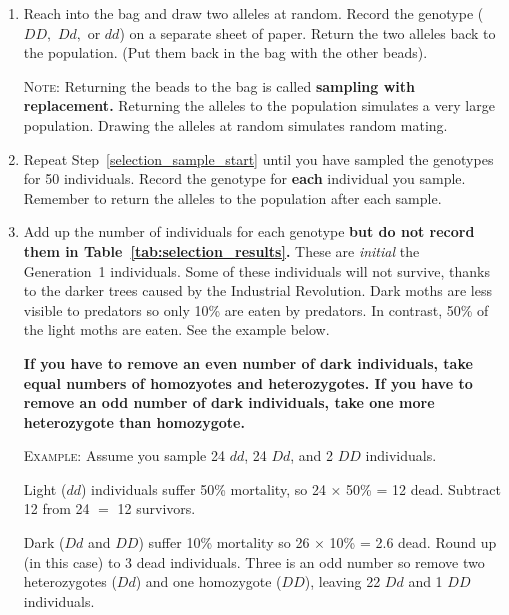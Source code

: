 \documentclass[12pt, hidelinks]{exam}
\newcommand{\allele}[1]{$#1$}
\begin{document}
\begin{questions}
\begin{enumerate}
	\item \label{selection_sample_start} Reach into the bag and draw two alleles at random. Record the genotype (\allele{DD,} \allele{Dd,} or \allele{dd}) on a separate sheet of paper. Return the two alleles back to the population. (Put them back in the bag with the other beads).
	
	\textsc{Note:} Returning the beads to the bag is called \textbf{sampling with replacement.} Returning the alleles to the population simulates a very large population. Drawing the alleles at random simulates random mating.
	
	\item Repeat Step~\ref{selection_sample_start} until you have sampled the genotypes for 50 individuals. Record the genotype for \textbf{each} individual you sample. Remember to return the alleles to the population after each sample. 
	
	\item Add up the number of individuals for each genotype \textbf{ but do not record them in Table~\ref{tab:selection_results}.} These are \emph{initial} the Generation~1 individuals. %
	 Some of these individuals will not survive, thanks to the darker trees caused by the Industrial Revolution. Dark moths are less visible to predators so only 10\% are eaten by predators. In contrast, 50\% of the light moths are eaten. See the example below.
	
	
	\textbf{If you have to remove an even number of dark individuals, take equal numbers of homozyotes and heterozygotes. If you have to remove an odd number of dark individuals, take one more heterozygote than homozygote.}
	
	\textsc{Example:} Assume you sample 24 \allele{dd}, 24 \allele{Dd}, and 2 \allele{DD} individuals.
	
	Light (\allele{dd}) individuals suffer 50\% mortality, so 24 $\times$ 50\% = 12 dead. Subtract 12 from 24 $=$ 12 survivors.
	
	Dark (\allele{Dd} and \allele{DD}) suffer 10\% mortality so 26 $\times$ 10\% = 2.6 dead. Round up (in this case) to 3 dead individuals. Three is an odd number so remove two heterozygotes (\allele{Dd}) and one homozygote (\allele{DD}), leaving 22 \allele{Dd} and 1 \allele{DD} individuals.	
	

\end{enumerate}
\end{questions}
\end{document}
